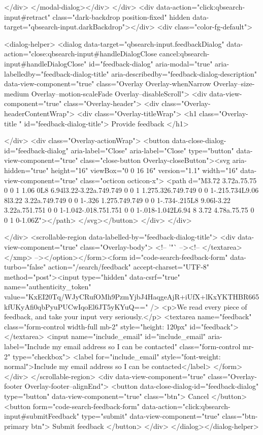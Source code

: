     </div>
</modal-dialog></div>
  </div>
  <div data-action="click:qbsearch-input#retract" class="dark-backdrop position-fixed" hidden data-target="qbsearch-input.darkBackdrop"></div>
  <div class="color-fg-default">
    
<dialog-helper>
  <dialog data-target="qbsearch-input.feedbackDialog" data-action="close:qbsearch-input#handleDialogClose cancel:qbsearch-input#handleDialogClose" id="feedback-dialog" aria-modal="true" aria-labelledby="feedback-dialog-title" aria-describedby="feedback-dialog-description" data-view-component="true" class="Overlay Overlay-whenNarrow Overlay--size-medium Overlay--motion-scaleFade Overlay--disableScroll">
    <div data-view-component="true" class="Overlay-header">
  <div class="Overlay-headerContentWrap">
    <div class="Overlay-titleWrap">
      <h1 class="Overlay-title " id="feedback-dialog-title">
        Provide feedback
      </h1>
        
    </div>
    <div class="Overlay-actionWrap">
      <button data-close-dialog-id="feedback-dialog" aria-label="Close" aria-label="Close" type="button" data-view-component="true" class="close-button Overlay-closeButton"><svg aria-hidden="true" height="16" viewBox="0 0 16 16" version="1.1" width="16" data-view-component="true" class="octicon octicon-x">
    <path d="M3.72 3.72a.75.75 0 0 1 1.06 0L8 6.94l3.22-3.22a.749.749 0 0 1 1.275.326.749.749 0 0 1-.215.734L9.06 8l3.22 3.22a.749.749 0 0 1-.326 1.275.749.749 0 0 1-.734-.215L8 9.06l-3.22 3.22a.751.751 0 0 1-1.042-.018.751.751 0 0 1-.018-1.042L6.94 8 3.72 4.78a.75.75 0 0 1 0-1.06Z"></path>
</svg></button>
    </div>
  </div>
  
</div>
      <scrollable-region data-labelled-by="feedback-dialog-title">
        <div data-view-component="true" class="Overlay-body">        <!-- '"` --><!-- </textarea></xmp> --></option></form><form id="code-search-feedback-form" data-turbo="false" action="/search/feedback" accept-charset="UTF-8" method="post"><input type="hidden" data-csrf="true" name="authenticity_token" value="KxEI20Tq/WJyCRufOMh9PzmYjbJ4HaqgeAjR+iUfX+lKxYKTHBR665kfUKyAfi0qbPyuPUCwIqoEl6JT5yKYuQ==" />
          <p>We read every piece of feedback, and take your input very seriously.</p>
          <textarea name="feedback" class="form-control width-full mb-2" style="height: 120px" id="feedback"></textarea>
          <input name="include_email" id="include_email" aria-label="Include my email address so I can be contacted" class="form-control mr-2" type="checkbox">
          <label for="include_email" style="font-weight: normal">Include my email address so I can be contacted</label>
</form></div>
      </scrollable-region>
      <div data-view-component="true" class="Overlay-footer Overlay-footer--alignEnd">          <button data-close-dialog-id="feedback-dialog" type="button" data-view-component="true" class="btn">    Cancel
</button>
          <button form="code-search-feedback-form" data-action="click:qbsearch-input#submitFeedback" type="submit" data-view-component="true" class="btn-primary btn">    Submit feedback
</button>
</div>
</dialog></dialog-helper>

